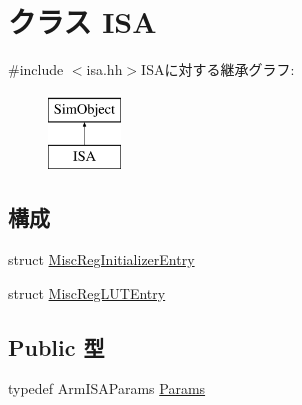\hypertarget{structArmISA_1_1ISA}{
\section{クラス ISA}
\label{structArmISA_1_1ISA}
}


{\ttfamily \#include $<$isa.hh$>$}ISAに対する継承グラフ:\begin{figure}[H]
\begin{center}
\leavevmode
\includegraphics[height=2cm]{structArmISA_1_1ISA}
\end{center}
\end{figure}
\subsection*{構成}
\begin{DoxyCompactItemize}
\item 
struct \hyperlink{structArmISA_1_1ISA_1_1MiscRegInitializerEntry}{MiscRegInitializerEntry}
\item 
struct \hyperlink{structArmISA_1_1ISA_1_1MiscRegLUTEntry}{MiscRegLUTEntry}
\end{DoxyCompactItemize}
\subsection*{Public 型}
\begin{DoxyCompactItemize}
\item 
typedef ArmISAParams \hyperlink{structArmISA_1_1ISA_a44000e19d886af0a346cd5a03302d3b6}{Params}
\end{DoxyCompactItemize}
